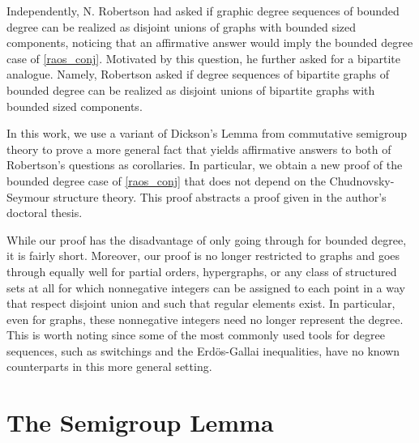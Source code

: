 \documentclass[review]{elsarticle}
\begin{document}
Independently, N. Robertson had asked\cite{neil_private} if
graphic degree sequences of bounded degree can be realized
as disjoint unions of graphs with bounded sized components,
noticing that an affirmative answer would imply the
bounded degree case of \ref{raos_conj}.
Motivated by this question, he further asked
for a bipartite analogue. Namely, Robertson asked if degree
sequences of bipartite graphs of bounded degree can be realized
as disjoint unions of bipartite graphs with bounded sized
components\cite{neil_private}.

In this work, we use a variant of Dickson's Lemma from
commutative semigroup theory to prove a more general fact
that yields affirmative answers to both of Robertson's questions
as corollaries. In particular, we obtain a new proof of
the bounded degree case of \ref{raos_conj} that does
not depend on the Chudnovsky-Seymour structure theory.
This proof abstracts a proof given in the author's doctoral
thesis\cite{my_thesis}.

While our proof has the disadvantage of only going through for bounded
degree, it is fairly short. Moreover,
our proof is no longer restricted to
graphs and goes through equally well for partial orders,
hypergraphs, or any class of structured sets at all for which
nonnegative integers can be assigned to each point in a way
that respect disjoint
union and such that regular elements exist.
In particular, even for graphs, these nonnegative integers
need no longer represent the degree.
This is worth noting since some of the most commonly
used tools for degree sequences, such as switchings\cite{switching} and the
Erd\"os-Gallai inequalities\cite{erdos_gallai},
have no known counterparts in this
more general setting.

\section{The Semigroup Lemma}
\end{document}
